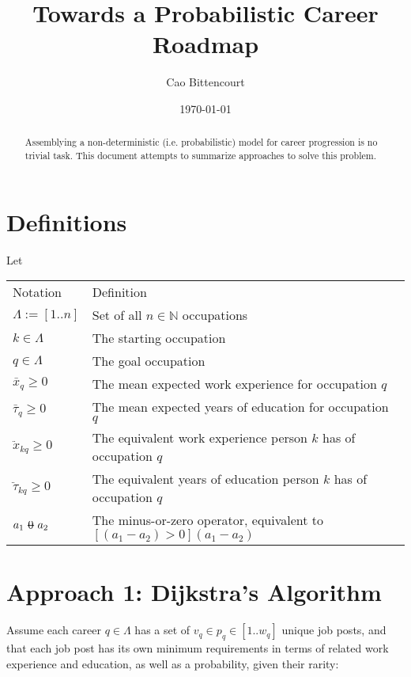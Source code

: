 \documentclass[12pt, a4paper]{article}
\title{
    Towards a Probabilistic Career Roadmap
}
\author{Cao Bittencourt}
\date{\today}
\makeatletter
\newcommand{\superimpose}[2]{{
  \ooalign{
    \hfil$\m@th#1\@firstoftwo#2$\hfil\cr
    \hfil$\m@th#1\@secondoftwo#2$\hfil\cr
  }
}}
\newcommand{\stack}[2]{\mathbin{\mathpalette\superimpose{{#1}{#2}}}}
\newcommand{\minuszero}{\stack{0}{-}}
\makeatother
\begin{document}
\maketitle

\begin{abstract}
  \noindent
  Assemblying a non-deterministic (i.e. probabilistic) model for career progression is no trivial task. This document attempts to summarize approaches to solve this problem.
\end{abstract}

\section{Definitions}
Let \newline \newline
\begin{tabular}{ll}
  Notation                  & Definition                                                                        \\
  $\Lambda := [1 .. n]$     & Set of all $n \in \mathbb{N}$ occupations                                         \\
  $k \in \Lambda$           & The starting occupation                                                           \\
  $q \in \Lambda$           & The goal occupation                                                               \\
  $\bar{x}_q \geq 0$        & The mean expected work experience for occupation $q$                              \\
  $\bar{\tau}_q \geq 0$     & The mean expected years of education for occupation $q$                           \\
  $\ddot{x}_{kq} \geq 0$    & The equivalent work experience person $k$ has of occupation $q$                   \\
  $\ddot{\tau}_{kq} \geq 0$ & The equivalent years of education person $k$ has of occupation $q$                \\
  $a_{1} \minuszero a_{2}$  & The minus-or-zero operator, equivalent to $[(a_{1} - a_{2}) > 0] (a_{1} - a_{2})$ \\
\end{tabular}

\section{Approach 1: Dijkstra's Algorithm}
Assume each career $q \in \Lambda$ has a set of $v_q \in p_q \in [1 .. w_q]$
unique job posts, and that each job post has its own minimum requirements in
terms of related work experience and education, as well as a probability, given
their rarity:
\end{document}
